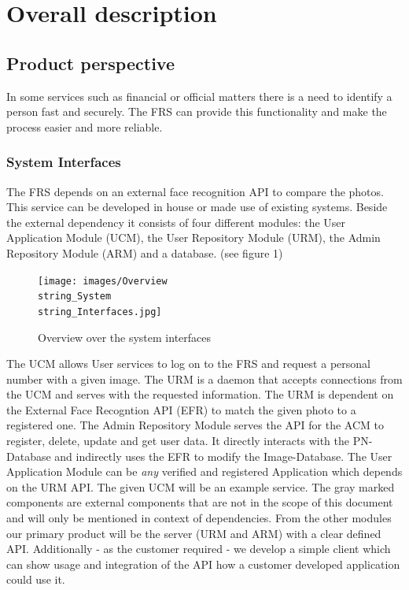 \documentclass[a4paper,11pt]{article}
\begin{document}
\newpage
\section{Overall description}

\subsection{Product perspective}
In some services such as financial or official matters there is a need to identify a person fast and securely. The FRS can provide this functionality and make the process easier and more reliable.

\subsubsection{System Interfaces} \label{ReqSystemInterfaces}
The FRS depends on an external face recognition API to compare the photos. This service can be developed in house or made use of existing systems. Beside the external dependency it consists of four different modules: the User Application Module (UCM), the User Repository Module (URM), the Admin Repository Module (ARM) and a database. (see figure 1)
\begin{figure}[h!]
	\centering
	\label{System Interfaces}
	\texttt{[image: images/Overview\\string\_System\\string\_Interfaces.jpg]}
	\caption{Overview over the system interfaces}
\end{figure}
\newpage
\noindent
The UCM allows User services to log on to the FRS and request a personal number with a given image. The URM is a daemon that accepts connections from the UCM and serves with the requested information. The URM is dependent on the External Face Recogntion API (EFR) to match the given photo to a registered one. The Admin Repository Module serves the API for the ACM to register, delete, update and get user data. It directly interacts with the PN-Database and indirectly uses the EFR to modify the Image-Database.
\newline
\noindent
The User Application Module can be \textit{any} verified and registered Application which depends on the URM API. The given UCM will be an example service. The gray marked components are external components that are not in the scope of this document and will only be mentioned in context of dependencies. From the other modules our primary product will be the server (URM and ARM) with a clear defined API. Additionally - as the customer required - we develop a simple client which can show usage and integration of the API how a customer developed application could use it.
\end{document}
